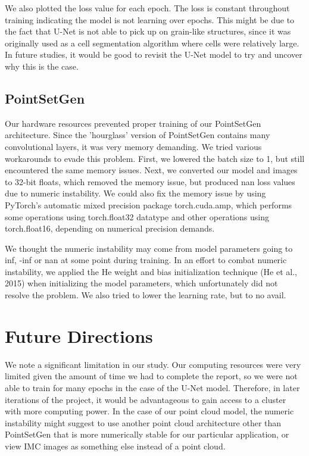 \documentclass[10pt,twocolumn,letterpaper]{article}
\begin{document}
We also plotted the loss value for each epoch. The loss is constant throughout training indicating the model is not learning over epochs. This might be due to the fact that U-Net is not able to pick up on grain-like structures, since it was originally used as a cell segmentation algorithm where cells were relatively large. In future studies, it would be good to revisit the U-Net model to try and uncover why this is the case. 

\subsection{PointSetGen}
Our hardware resources prevented proper training of our PointSetGen architecture. Since the 'hourglass' version of PointSetGen contains many convolutional layers, it was very memory demanding. We tried various workarounds to evade this problem. First, we lowered the batch size to 1, but still encountered the same memory issues. Next, we converted our model and images to 32-bit floats, which removed the memory issue, but produced nan loss values due to numeric instability. We could also fix the memory issue by using PyTorch's automatic mixed precision package torch.cuda.amp, which performs some operations using torch.float32 datatype and other operations using torch.float16, depending on numerical precision demands. 

We thought the numeric instability may come from model parameters going to inf, -inf or nan at some point during training. In an effort to combat numeric instability, we applied the He weight and bias initialization technique (He et al., 2015) when initializing the model parameters, which unfortunately did not resolve the problem. We also tried to lower the learning rate, but to no avail.

\section{Future Directions}
We note a significant limitation in our study. Our computing resources were very limited given the amount of time we had to complete the report, so we were not able to train for many epochs in the case of the U-Net model. Therefore, in later iterations of the project, it would be advantageous to gain access to a cluster with more computing power. In the case of our point cloud model, the numeric instability might suggest to use another point cloud architecture other than PointSetGen that is more numerically stable for our particular application, or view IMC images as something else instead of a point cloud.
\end{document}
